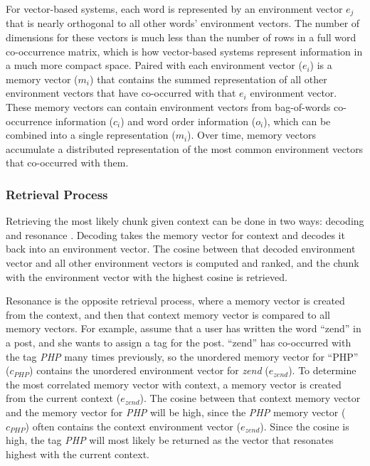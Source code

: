 \documentclass[man,floatsintext,donotrepeattitle]{apa6}
\begin{document}
For vector-based systems, each word is represented by an environment vector $e_{j}$ that is nearly orthogonal to all other words' environment vectors.
The number of dimensions for these vectors is much less than the number of rows in a full word co-occurrence matrix, which is how vector-based systems represent information in a much more compact space.
Paired with each environment vector ($e_{i}$) is a memory vector ($m_{i}$) that contains the summed representation of all other environment vectors that have co-occurred with that $e_{i}$ environment vector.
These memory vectors can contain environment vectors from bag-of-words co-occurrence information ($c_{i}$) and word order information ($o_{i}$), which can be combined into a single representation ($m_{i}$).
Over time, memory vectors accumulate a distributed representation of the most common environment vectors that co-occurred with them.

\subsubsection{Retrieval Process}

Retrieving the most likely chunk given context can be done in two ways: decoding and resonance \parencite{Jones2007}.
Decoding takes the memory vector for context and decodes it back into an environment vector.
The cosine between that decoded environment vector and all other environment vectors is computed and ranked, and the chunk with the environment vector with the highest cosine is retrieved.

Resonance is the opposite retrieval process, where a memory vector is created from the context, and then that context memory vector is compared to all memory vectors.
For example, assume that a user has written the word ``zend'' in a post, and she wants to assign a tag for the post.
``zend'' has co-occurred with the tag \emph{PHP} many times previously, so the unordered memory vector for ``PHP'' ($c_{\mathit{PHP}}$) contains the unordered environment vector for \emph{zend} ($e_{zend}$).
To determine the most correlated memory vector with context, a memory vector is created from the current context ($e_{zend}$).
The cosine between that context memory vector and the memory vector for \emph{PHP} will be high, since the \emph{PHP} memory vector ($c_{\mathit{PHP}}$) often contains the context environment vector ($e_{zend}$).
Since the cosine is high, the tag \emph{PHP} will most likely be returned as the vector that resonates highest with the current context.
\end{document}
